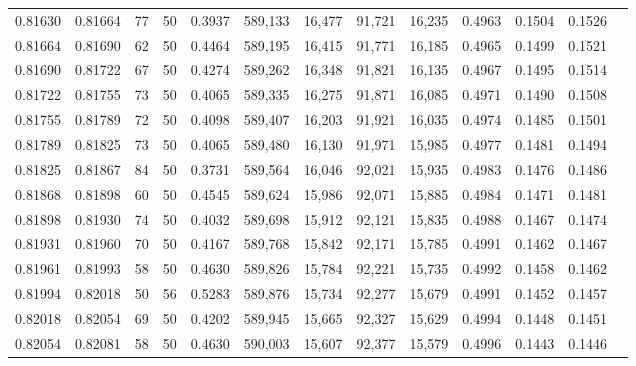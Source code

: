 \begin{tabular}{rrrrrrrrrrrrr}
0.81630 & 0.81664 &    77 &  50 &                                     0.3937 & 589,133 &  16,477 &  91,721 &  16,235 & 0.4963 & 0.1504 & 0.1526 \\
0.81664 & 0.81690 &    62 &  50 &                                     0.4464 & 589,195 &  16,415 &  91,771 &  16,185 & 0.4965 & 0.1499 & 0.1521 \\
0.81690 & 0.81722 &    67 &  50 &                                     0.4274 & 589,262 &  16,348 &  91,821 &  16,135 & 0.4967 & 0.1495 & 0.1514 \\
0.81722 & 0.81755 &    73 &  50 &                                     0.4065 & 589,335 &  16,275 &  91,871 &  16,085 & 0.4971 & 0.1490 & 0.1508 \\
0.81755 & 0.81789 &    72 &  50 &                                     0.4098 & 589,407 &  16,203 &  91,921 &  16,035 & 0.4974 & 0.1485 & 0.1501 \\
0.81789 & 0.81825 &    73 &  50 &                                     0.4065 & 589,480 &  16,130 &  91,971 &  15,985 & 0.4977 & 0.1481 & 0.1494 \\
0.81825 & 0.81867 &    84 &  50 &                                     0.3731 & 589,564 &  16,046 &  92,021 &  15,935 & 0.4983 & 0.1476 & 0.1486 \\
0.81868 & 0.81898 &    60 &  50 &                                     0.4545 & 589,624 &  15,986 &  92,071 &  15,885 & 0.4984 & 0.1471 & 0.1481 \\
0.81898 & 0.81930 &    74 &  50 &                                     0.4032 & 589,698 &  15,912 &  92,121 &  15,835 & 0.4988 & 0.1467 & 0.1474 \\
0.81931 & 0.81960 &    70 &  50 &                                     0.4167 & 589,768 &  15,842 &  92,171 &  15,785 & 0.4991 & 0.1462 & 0.1467 \\
0.81961 & 0.81993 &    58 &  50 &                                     0.4630 & 589,826 &  15,784 &  92,221 &  15,735 & 0.4992 & 0.1458 & 0.1462 \\
0.81994 & 0.82018 &    50 &  56 &                                     0.5283 & 589,876 &  15,734 &  92,277 &  15,679 & 0.4991 & 0.1452 & 0.1457 \\
0.82018 & 0.82054 &    69 &  50 &                                     0.4202 & 589,945 &  15,665 &  92,327 &  15,629 & 0.4994 & 0.1448 & 0.1451 \\
0.82054 & 0.82081 &    58 &  50 &                                     0.4630 & 590,003 &  15,607 &  92,377 &  15,579 & 0.4996 & 0.1443 & 0.1446 \\

\end{tabular}
